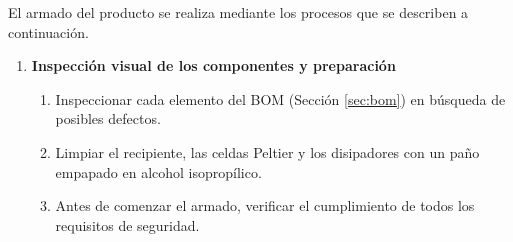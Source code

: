 \documentclass[12pt, a4paper]{article}
\begin{document}
El armado del producto se realiza mediante los procesos que se describen a continuación.

\begin{enumerate}
    \item \textbf{Inspección visual de los componentes y preparación}
    \begin{enumerate}[label=\alph*.]
        \item Inspeccionar cada elemento del BOM (Sección \ref{sec:bom}) en búsqueda de posibles defectos.
        \item Limpiar el recipiente, las celdas Peltier y los disipadores con un paño empapado en alcohol isopropílico.
        \item Antes de comenzar el armado, verificar el cumplimiento de todos los requisitos de seguridad.
    \end{enumerate}


\end{enumerate}
\end{document}
